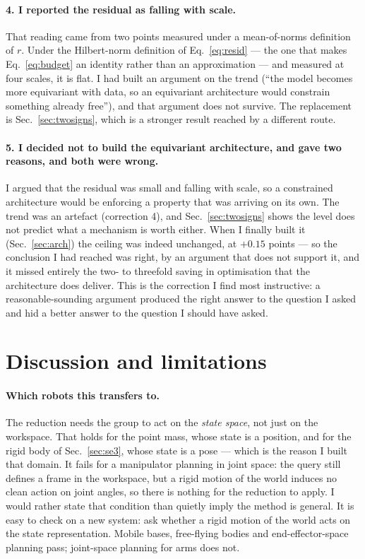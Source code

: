 \documentclass[11pt,a4paper]{article}
\begin{document}
\paragraph{4. I reported the residual as falling with scale.} That reading came
from two points measured under a mean-of-norms definition of $r$. Under the
Hilbert-norm definition of Eq.~\eqref{eq:resid} --- the one that makes
Eq.~\eqref{eq:budget} an identity rather than an approximation --- and measured
at four scales, it is flat. I had built an argument on the trend (``the model
becomes more equivariant with data, so an equivariant architecture would
constrain something already free''), and that argument does not survive. The
replacement is Sec.~\ref{sec:twosigns}, which is a stronger result reached by a
different route.

\paragraph{5. I decided not to build the equivariant architecture, and gave two
reasons, and both were wrong.} I argued that the residual was small and falling
with scale, so a constrained architecture would be enforcing a property that was
arriving on its own. The trend was an artefact (correction 4), and
Sec.~\ref{sec:twosigns} shows the level does not predict what a mechanism is
worth either. When I finally built it (Sec.~\ref{sec:arch}) the ceiling was
indeed unchanged, at $+0.15$ points --- so the conclusion I had reached was
right, by an argument that does not support it, and it missed entirely the
two- to threefold saving in optimisation that the architecture does deliver. This is the
correction I find most instructive: a reasonable-sounding argument produced the
right answer to the question I asked and hid a better answer to the question I
should have asked.

\section{Discussion and limitations}
\label{sec:limits}

\paragraph{Which robots this transfers to.} The reduction needs the group to act
on the \emph{state space}, not just on the workspace. That holds for the point
mass, whose state is a position, and for the rigid body of Sec.~\ref{sec:se3},
whose state is a pose --- which is the reason I built that domain. It fails for a
manipulator planning in joint space: the query still defines a frame in the
workspace, but a rigid motion of the world induces no clean action on joint
angles, so there is nothing for the reduction to apply. I would rather state that
condition than quietly imply the method is general. It is easy to check on a new
system: ask whether a rigid motion of the world acts on the state representation.
Mobile bases, free-flying bodies and end-effector-space planning pass; joint-space
planning for arms does not.
\end{document}
